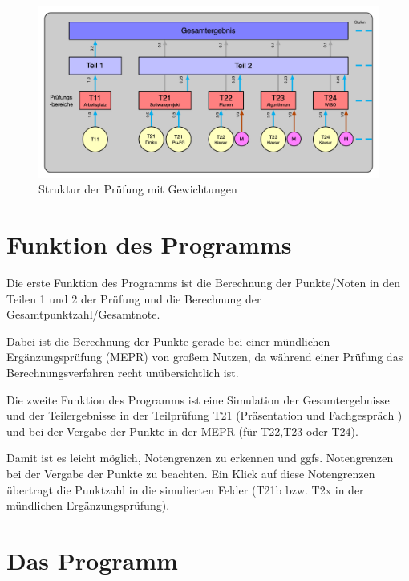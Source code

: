 \documentclass[a4paper,notitlepage,parskip=half]{scrartcl}
\begin{document}
\begin{figure}[ht]
    \centering
\includegraphics[width=15cm]{FIGrafik.png}
    \caption{Struktur der Prüfung mit Gewichtungen}
    \label{fig:berechnung}
\end{figure}

\section{Funktion des Programms}
Die erste Funktion des Programms ist die Berechnung der Punkte/Noten in den Teilen 1 und 2 der Prüfung und die Berechnung der Gesamtpunktzahl/Gesamtnote.

Dabei ist die Berechnung der Punkte gerade bei einer mündlichen Ergänzungsprüfung (MEPR) von großem Nutzen, da während einer Prüfung  das Berechnungsverfahren recht unübersichtlich ist.

Die zweite Funktion des Programms ist eine Simulation der Gesamtergebnisse und der Teilergebnisse in der Teilprüfung T21 (Präsentation und Fachgespräch )  und bei der Vergabe der Punkte in der MEPR (für T22,T23 oder T24).

Damit ist es leicht möglich, Notengrenzen zu erkennen und ggfs. Notengrenzen bei der Vergabe der Punkte zu beachten.
Ein Klick auf diese Notengrenzen übertragt die Punktzahl in die simulierten Felder (T21b bzw. T2x in der mündlichen Ergänzungsprüfung).

\section{Das Programm}
\end{document}
